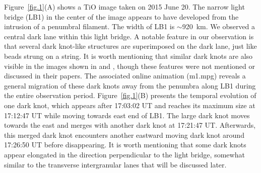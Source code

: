 \documentclass[preprint2]{aastex}
\begin{document}
Figure~\ref{fig.1}(A) shows a TiO image taken on 2015 June 20. The narrow light bridge (LB1) in the center of the image appears to have developed from the intrusion of a penumbral filament. The width of LB1 is $\sim$920~km. We observed a central dark lane within this light bridge. A notable feature in our observation is that several dark knot-like structures are superimposed on the dark lane, just like beads strung on a string. It is worth mentioning that similar dark knots are also visible in the images shown in \cite{Song2017} and \cite{Schlichenmaier2016}, though these features were not mentioned or discussed in their papers. The associated online animation (m1.mpg) reveals a general migration of these dark knots away from the penumbra along LB1 during the entire observation period. Figure~\ref{fig.1}(B) presents the temporal evolution of one dark knot, which appears after 17:03:02 UT and reaches its maximum size at 17:12:47 UT while moving towards east end of LB1. The large dark knot moves towards the east and merges with another dark knot at 17:21:47 UT. Afterwards, this merged dark knot encounters another eastward moving dark knot around 17:26:50 UT before disappearing. It is worth mentioning that some dark knots appear elongated in the direction perpendicular to the light bridge, somewhat similar to the transverse intergranular lanes that will be discussed later.
\end{document}
